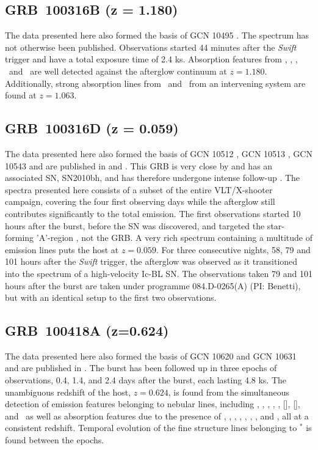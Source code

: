 \documentclass[longauth]{aa}    %
\begin{document}
\subsection{GRB~100316B (z = 1.180)} \label{100316B}

The data presented here also formed the basis of GCN 10495 \citep{GCN10495}. The
spectrum has not otherwise been published. Observations started 44 minutes after
the \textit{Swift} trigger and have a total exposure time of 2.4 ks. Absorption
features from \feii, \alii, \aliii,	\mgii~and \mgi~are well detected against the
afterglow continuum at $z = 1.180$. Additionally, strong absorption lines from
\feii~and \mgii~from an intervening system are found at $z = 1.063$.

\subsection{GRB~100316D (z = 0.059)} \label{100316D}

The data presented here also formed the basis of GCN 10512 \citep{GCN10512}, GCN
10513 \citep{GCN10513}, GCN 10543 \citep{GCN10543} and are published in
\citet{Bufano2012} and \citet{Starling2011}. This GRB is very close by and has
an associated SN, SN2010bh, and has therefore undergone intense follow-up
\citep{Olivares2011, Cano2011a, Izzo2017}. The spectra presented here consists
of a subset of the entire VLT/X-shooter campaign, covering the four first
observing days while the afterglow still contributes significantly to the total
emission. The first observations started 10 hours after the burst, before the SN
was discovered, and targeted the star-forming 'A'-region \citep{Starling2011},
not the GRB. A very rich spectrum containing a multitude of emission lines puts
the host at $z = 0.059$. For three consecutive nights, 58, 79 and 101 hours
after the \textit{Swift} trigger, the afterglow was observed as it transitioned
into the spectrum of a high-velocity Ic-BL SN. The observations taken 79 and 101
hours after the burst are taken under programme 084.D-0265(A) (PI: Benetti), but
with an identical setup to the first two observations.

\subsection{GRB~100418A (z=0.624)} \label{100418}

The data presented here also formed the basis of GCN 10620 \citep{GCN10620} and
GCN 10631 \citep{GCN10631} and are published in \citet{DeUgartePostigo2011}. The
burst has been followed up in three epochs of observations, 0.4, 1.4, and 2.4
days after the burst, each lasting 4.8 ks. The unambiguous redshift of the host,
$z=0.624$, is found from the simultaneous detection of emission features
belonging to nebular lines, including \hi, \oii, \oiii, \neiii, \nii, [\sii],
[\siii], and \hei~as well as absorption features due to the presence of \znii,
\crii, \feii, \mnii, \mgii, \mgi, \tiii, and \caii, all at a consistent
redshift. Temporal evolution of the fine structure lines belonging to \feii$^*$
is found between the epochs.
\end{document}
